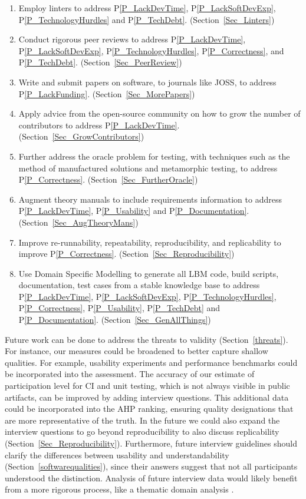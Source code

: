 \documentclass[final, 3p, times, authoryear]{elsarticle}
\newcommand{\ppref}[1]{P\ref{#1}}
\begin{document}
\begin{enumerate}
	\item Employ linters to address \ppref{P_LackDevTime}, \ppref{P_LackSoftDevExp}, \ppref{P_TechnologyHurdles} and \ppref{P_TechDebt}. (Section~\ref{Sec_Linters})
	\item Conduct rigorous peer reviews to address \ppref{P_LackDevTime},
	\ppref{P_LackSoftDevExp}, \ppref{P_TechnologyHurdles},
	\ppref{P_Correctness}, and \ppref{P_TechDebt}.
	(Section~\ref{Sec_PeerReview}) 
	\item Write and submit papers on software, to journals like JOSS, to address
	\ppref{P_LackFunding}. (Section~\ref{Sec_MorePapers})
	\item Apply advice from the open-source community on how to grow the number
	of contributors to address \ppref{P_LackDevTime}.
	(Section~\ref{Sec_GrowContributors})
	\item Further address the oracle problem for testing, with techniques such as the method of manufactured solutions and metamorphic testing, to address
	\ppref{P_Correctness}. (Section~\ref{Sec_FurtherOracle})
	\item Augment theory manuals to include requirements information to address
	\ppref{P_LackDevTime}, \ppref{P_Usability} and \ppref{P_Documentation}.
	(Section~\ref{Sec_AugTheoryMans})
	\item Improve re-runnability, repeatability, reproducibility, and
	replicability to improve \ppref{P_Correctness}.
	(Section~\ref{Sec_Reproducibility})
	\item Use Domain Specific Modelling to generate all LBM code, build scripts,
	documentation, test cases from a stable knowledge base to address
	\ppref{P_LackDevTime}, \ppref{P_LackSoftDevExp},
	\ppref{P_TechnologyHurdles}, \ppref{P_Correctness}, \ppref{P_Usability},
	\ppref{P_TechDebt} and \ppref{P_Documentation}.
	(Section~\ref{Sec_GenAllThings})
\end{enumerate}

Future work can be done to address the threats to validity
(Section~\ref{threats}).  For instance, our measures could be broadened to
better capture shallow qualities. For example, usability experiments and
performance benchmarks could be incorporated into the assessment. The accuracy
of our estimate of participation level for CI and unit testing, which is not
always visible in public artifacts, can be improved by adding interview
questions. This additional data could be incorporated into the AHP ranking,
ensuring quality designations that are more representative of the truth. In the
future we could also expand the interview questions to go beyond reproducibility
to also discuss replicability (Section~\ref{Sec_Reproducibility}). Furthermore,
future interview guidelines should clarify the differences between usability and
understandability (Section~\ref{softwarequalities}), since their answers suggest
that not all participants understood the distinction.  Analysis of future
interview data would likely benefit from a more rigorous process, like a
thematic domain analysis \citep{JungEtAl2022}.
\end{document}
